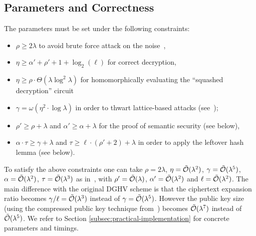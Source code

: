 \documentclass[11pt]{llncs}
\renewcommand\geq\geqslant
\newcommand{\Ot}[1]{{\cal \tilde O}(#1)}
\begin{document}
\subsection{Parameters and Correctness}

\label{s:constraints}

 The parameters must be
set under the following constraints:
\begin{itemize}
\renewcommand{\labelitemi}{\tiny $\bullet$}
\itemsep.4em
\item $\rho \geq 2\lambda$ to avoid brute force attack on the noise~\cite{CN2012},

\item $\eta \geq \alpha'+\rho'+1+\log_2(\ell)$ for correct decryption,

\item  $\eta\geq \rho \cdot \Theta(\lambda\log^2\lambda)$ for
  homomorphically evaluating the ``squashed decryption'' circuit

\item $\gamma = \omega(\eta^2\cdot \log\lambda)$ in order to thwart
  lattice-based attacks (see~\cite{vDGHV2010,CMNT2011});

\item $\rho' \geq \rho + \lambda$ and  $\alpha' \geq \alpha+\lambda$  for
  the proof of semantic security (see below),

\item $\alpha\cdot \tau\geq \gamma+\lambda$ and $\tau \geq \ell \cdot
  (\rho'+2) + \lambda$ in order to apply the
  leftover hash lemma (see below).
\end{itemize}




To satisfy the above constraints one can take $\rho=2\lambda$,
$\eta=\Ot{\lambda^2}$, $\gamma=\Ot{\lambda^5}$,
$\alpha=\Ot{\lambda^2}$, $\tau=\Ot{\lambda^3}$ as in~\cite{CNT2012},
with $\rho'=\Ot{\lambda}$, $\alpha'=\Ot{\lambda^2}$ and $\ell=\Ot{\lambda^2}$. 
The main difference with the original DGHV scheme is that the
ciphertext expansion ratio becomes $\gamma/\ell=\Ot{\lambda^3}$
instead of $\gamma=\Ot{\lambda^5}$. However the public key size (using
the compressed public key technique from~\cite{CNT2012}) becomes 
$\Ot{\lambda^7}$ instead of $\Ot{\lambda^5}$. We refer to Section 
\ref{subsec:practical-implementation} for concrete parameters and
timings.
\end{document}
